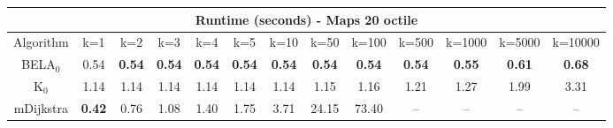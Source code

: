\begin{tabular}{c|cccccccccccc}\toprule
\multicolumn{13}{c}{Runtime (seconds) - Maps 20 octile}\\ \midrule
Algorithm & k=1 & k=2 & k=3 & k=4 & k=5 & k=10 & k=50 & k=100 & k=500 & k=1000 & k=5000 & k=10000 \\ \midrule
BELA$_0$ & 0.54 & \textbf{0.54} & \textbf{0.54} & \textbf{0.54} & \textbf{0.54} & \textbf{0.54} & \textbf{0.54} & \textbf{0.54} & \textbf{0.54} & \textbf{0.55} & \textbf{0.61} & \textbf{0.68} \\
K$_0$ & 1.14 & 1.14 & 1.14 & 1.14 & 1.14 & 1.14 & 1.15 & 1.16 & 1.21 & 1.27 & 1.99 & 3.31 \\
mDijkstra & \textbf{0.42} & 0.76 & 1.08 & 1.40 & 1.75 & 3.71 & 24.15 & 73.40 & -- & -- & -- & -- \\ \bottomrule 
\end{tabular}
